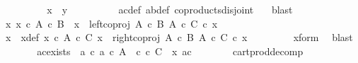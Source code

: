 \begin{isabellebody}
\ \ \ \ \ \ \isamarkupfalse%
\ \isamarkupfalse%
\ {\isachardoublequoteopen}x\ {\isacharequal}{\kern0pt}\ y{\isachardoublequoteclose}\isanewline
\ \ \ \ \ \ \ \ \isamarkupfalse%
\ a{\isacharprime}{\kern0pt}c{\isacharprime}{\kern0pt}{\isacharunderscore}{\kern0pt}def\ ab{\isacharunderscore}{\kern0pt}def\ coproducts{\isacharunderscore}{\kern0pt}disjoint\ \ \isamarkupfalse%
\ blast\isanewline
\ \ \ \ \isamarkupfalse%
\isanewline
\ \ \isamarkupfalse%
\isanewline
\ \ \ \ \isamarkupfalse%
\ {\isachardoublequoteopen}{\isasymnexists}x{\isacharprime}{\kern0pt}{\isachardot}{\kern0pt}\ x{\isacharprime}{\kern0pt}\ {\isasymin}\isactrlsub c\ A\ {\isasymtimes}\isactrlsub c\ B\ {\isasymand}\ x\ {\isacharequal}{\kern0pt}\ left{\isacharunderscore}{\kern0pt}coproj\ {\isacharparenleft}{\kern0pt}A\ {\isasymtimes}\isactrlsub c\ B{\isacharparenright}{\kern0pt}\ {\isacharparenleft}{\kern0pt}A\ {\isasymtimes}\isactrlsub c\ C{\isacharparenright}{\kern0pt}\ {\isasymcirc}\isactrlsub c\ x{\isacharprime}{\kern0pt}{\isachardoublequoteclose}\isanewline
\ \ \ \ \isamarkupfalse%
\ \isamarkupfalse%
\ x{\isacharprime}{\kern0pt}\ \ x{\isacharprime}{\kern0pt}{\isacharunderscore}{\kern0pt}def{\isacharcolon}{\kern0pt}\ {\isachardoublequoteopen}x{\isacharprime}{\kern0pt}\ {\isasymin}\isactrlsub c\ A\ {\isasymtimes}\isactrlsub c\ C{\isachardoublequoteclose}\ {\isachardoublequoteopen}x\ {\isacharequal}{\kern0pt}\ right{\isacharunderscore}{\kern0pt}coproj\ {\isacharparenleft}{\kern0pt}A\ {\isasymtimes}\isactrlsub c\ B{\isacharparenright}{\kern0pt}\ {\isacharparenleft}{\kern0pt}A\ {\isasymtimes}\isactrlsub c\ C{\isacharparenright}{\kern0pt}\ {\isasymcirc}\isactrlsub c\ x{\isacharprime}{\kern0pt}{\isachardoublequoteclose}\isanewline
\ \ \ \ \ \ \isamarkupfalse%
\ \ x{\isacharunderscore}{\kern0pt}form\ \isamarkupfalse%
\ blast\isanewline
\ \ \ \ \isamarkupfalse%
\ \isamarkupfalse%
\ ac{\isacharunderscore}{\kern0pt}exists{\isacharcolon}{\kern0pt}\ {\isachardoublequoteopen}{\isasymexists}\ a\ c{\isachardot}{\kern0pt}\ a\ {\isasymin}\isactrlsub c\ A\ {\isasymand}\ c\ {\isasymin}\isactrlsub c\ C\ {\isasymand}\ x{\isacharprime}{\kern0pt}\ {\isacharequal}{\kern0pt}{\isasymlangle}a{\isacharcomma}{\kern0pt}c{\isasymrangle}{\isachardoublequoteclose}\isanewline
\ \ \ \ \ \ \isamarkupfalse%
\ cart{\isacharunderscore}{\kern0pt}prod{\isacharunderscore}{\kern0pt}decomp\ \isamarkupfalse%

\end{isabellebody}
